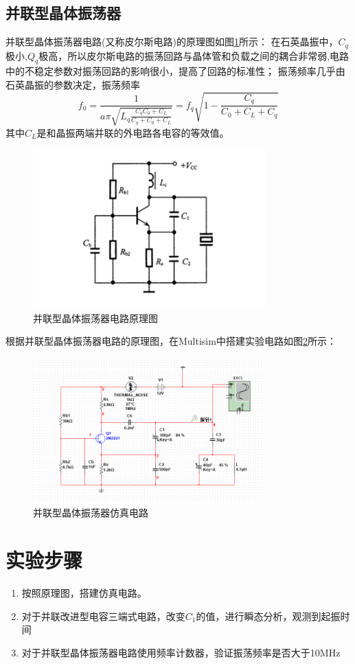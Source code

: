 \documentclass[UTF8]{ctexart}
\begin{document}
\subsection{并联型晶体振荡器}
并联型晶体振荡器电路(又称皮尔斯电路)的原理图如图\ref{img:3}所示：
在石英晶振中，$C_q$极小,$Q_q$极高，所以皮尔斯电路的振荡回路与晶体管和负载之间的耦合非常弱,电路中的不稳定参数对振荡回路的影响很小，提高了回路的标准性；
振荡频率几乎由石英晶振的参数决定，振荡频率
$$
f_0=\frac{1}{a\pi\sqrt{L_q \frac{C_q{C_0+C_L}}{C_q+C_0+C_L}}}=f_q\sqrt{1-\frac{C_q}{C_0+C_L+C_q}}
$$
其中$C_L$是和晶振两端并联的外电路各电容的等效值。
\begin{figure}[htbp]
    \centering
    \includegraphics[width=0.8\textwidth]{3.png}
    \caption{并联型晶体振荡器电路原理图}
    \label{img:3}
\end{figure}
根据并联型晶体振荡器电路的原理图，在Multisim中搭建实验电路如图\ref{img:4}所示：
\begin{figure}[htbp]
    \centering
    \includegraphics[width=0.8\textwidth]{4.png}
    \caption{并联型晶体振荡器仿真电路}
    \label{img:4}
\end{figure}
\section{实验步骤}
\begin{enumerate}
    \item 按照原理图，搭建仿真电路。
    \item 对于并联改进型电容三端式电路，改变$C_1$的值，进行瞬态分析，观测到起振时间
    \item 对于并联型晶体振荡器电路使用频率计数器，验证振荡频率是否大于10MHz
\end{enumerate}
\end{document}
